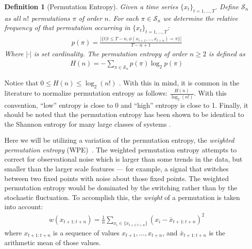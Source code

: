 \documentclass{article}
\newtheorem*{mydef}{Definition}
\begin{document}
\begin{mydef}[Permutation Entropy]

  Given a time series $\{x_t\}_{t = 1,\dots,T}$. Define $\mathcal{S}_n$ as all
  $n!$ permutations $\pi$ of order $n$. For each $\pi \in \mathcal{S}_n$ we
  determine the relative frequency of that permutation occurring in $\{x_t\}_{t
  = 1,\dots,T}$:
  \begin{align*}
    p(\pi) = \frac{\left|\{t|t \leq T-n,\phi(x_{t+1},\dots,x_{t+n}) = \pi\}\right|}{T-n+1}
  \end{align*}
  Where $|\cdot|$ is set cardinality. The \emph{permutation entropy} of order $n
  \ge 2$ is defined as
  \begin{align*}
  H(n) = - \sum_{\pi \in \mathcal{S}_n} p(\pi) \log_2 p(\pi)
  \end{align*}

\end{mydef}

Notice that $0\le H(n) \le \log_2(n!)$ \cite{bandt2002per}.  With this in mind,
it is common in the literature to normalize permutation entropy as follows:
$\frac{H(n)}{\log_2(n!)}$.  With this convention, ``low'' entropy is close to 0
and ``high'' entropy is close to 1. Finally, it should be noted that the
permutation entropy has been shown to be identical to the Shannon entropy for
many large classes of systems \cite{amigo2012permutation}.

Here we will be utilizing a variation of the permutation entropy, the
\emph{weighted permutation entropy} (WPE)~\cite{fadlallah2013}. The weighted
permutation entropy attempts to correct for observational noise which is larger
than some trends in the data, but smaller than the larger scale features --- for
example, a signal that switches between two fixed points with noise about those
fixed points. The weighted permutation entropy would be dominated by the
switching rather than by the stochastic fluctuation. To accomplish this, the
\emph{weight} of a permutation is taken into account:
\begin{align*}
  w(x_{t+1:t+n}) = \frac{1}{n}
                 \sum_{x_i \in \{x_{t+1:t+n}\}}
                 \left( x_i - \bar{x}_{t+1:t+n} \right)^2
\end{align*}
where $x_{t+1:t+n}$ is a sequence of values $x_{t+1}, \ldots, x_{t+n}$, and
$\bar{x}_{t+1:t+n}$ is the arithmetic mean of those values.
\end{document}

